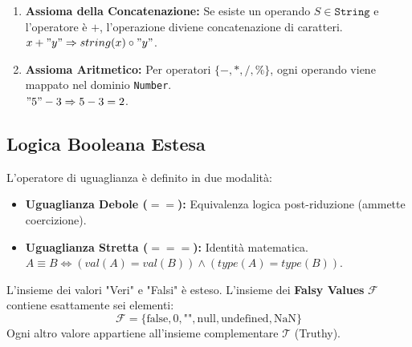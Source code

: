 \begin{enumerate}
    \item \textbf{Assioma della Concatenazione:} Se esiste un operando $S \in \texttt{String}$ e l'operatore è $+$, l'operazione diviene concatenazione di caratteri.
    \\ $x + "y" \Rightarrow string(x) \circ "y"$.
    \item \textbf{Assioma Aritmetico:} Per operatori $\{-, *, /, \%\}$, ogni operando viene mappato nel dominio \texttt{Number}.
    \\ $"5" - 3 \Rightarrow 5 - 3 = 2$.
\end{enumerate}

\subsection{Logica Booleana Estesa}
L'operatore di uguaglianza è definito in due modalità:
\begin{itemize}
    \item \textbf{Uguaglianza Debole ($==$):} Equivalenza logica post-riduzione (ammette coercizione).
    \item \textbf{Uguaglianza Stretta ($===$):} Identità matematica. $A \equiv B \iff (val(A) = val(B)) \land (type(A) = type(B))$.
\end{itemize}

L'insieme dei valori "Veri" e "Falsi" è esteso. L'insieme dei \textbf{Falsy Values} $\mathcal{F}$ contiene esattamente sei elementi:
$$ \mathcal{F} = \{ \text{false}, 0, \text{""}, \text{null}, \text{undefined}, \text{NaN} \} $$
Ogni altro valore appartiene all'insieme complementare $\mathcal{T}$ (Truthy).
